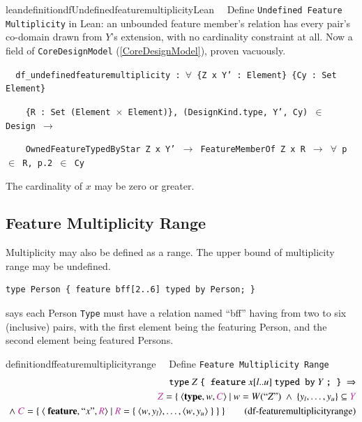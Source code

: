 \begin{restatable}{leandefinition}{dfUndefinedfeaturemultiplicityLean}~~
Define \texttt{Undefined Feature Multiplicity} in Lean: an unbounded feature member's relation has every
pair's co-domain drawn from $Y$'s extension, with no cardinality constraint at all. Now a field of
\texttt{CoreDesignModel} (\ref{CoreDesignModel}), proven vacuously.

\texttt{~~df\_undefinedfeaturemultiplicity : $\forall$ \{Z x Y' : Element\} \{Cy : Set Element\}}

\texttt{~~~~\{R : Set (Element $\times$ Element)\}, (DesignKind.type, Y', Cy) $\in$ Design $\to$}

\texttt{~~~~OwnedFeatureTypedByStar Z x Y' $\to$ FeatureMemberOf Z x R $\to$ $\forall$ p $\in$ R, p.2 $\in$ Cy}
\label{df_undefinedfeaturemultiplicity}
\end{restatable}

The cardinality of $x$ may be zero or greater.

\subsection{Feature Multiplicity Range}  

\pn Multiplicity may also be defined as a range.  The upper bound of multiplicity range may be undefined.

\begin{lstlisting}
type Person { feature bff[2..6] typed by Person; }
\end{lstlisting}
says each Person \texttt{Type} must have a relation named ``bff'' having from two to six (inclusive) pairs, with the first element being the featuring Person, and the second element being  featured Persons.  

\begin{restatable}{definition}{dffeaturemultiplicityrange}~~   Define \texttt{Feature Multiplicity Range}
\begin{align}
\texttt{type}~ Z ~\texttt{\{ feature}~ x[l..u] ~\texttt{typed by}~ Y~\texttt{; \}}~\Rightarrow  \notag \\
\mc{Z}=\{~\langle \textbf{type},w,\mc{C}\rangle~\vert~w=W(``Z")~\wedge~\{ y_l,\ldots,y_u\} \subseteq \mc{Y} \notag \\
~\wedge~ \mc{C}=\{~\langle~\textbf{feature}, ``x",\mc{R} \rangle~\vert ~\mc{R}=\{~\langle w,y_l\rangle,\ldots,\langle w,y_u\rangle~\}~\}~\}\label{eq:df-featuremultiplicityrange}\tag{df-featuremultiplicityrange}
\end{align}
\end{restatable}

